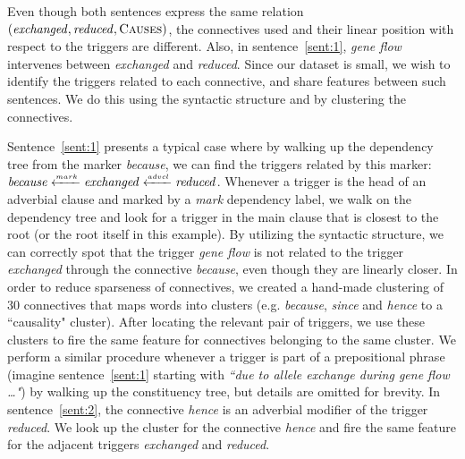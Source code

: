 Even though both sentences express the same relation $(\mbox{\emph{exchanged}},\mbox{\emph{reduced}},\mbox{\textsc{Causes}})$, the connectives used and their linear position with respect to the triggers are different. Also, in sentence~\ref{sent:1}, \emph{gene flow} intervenes between \emph{exchanged} and \emph{reduced}. Since our dataset is small, we wish to identify the triggers related to each connective, and share features between such sentences. We do this using the syntactic structure and by clustering the connectives.

Sentence~\ref{sent:1} presents a typical case where by walking up the dependency tree from the marker \emph{because}, we can find the triggers related by this marker: $\mbox{\emph{because}}\xleftarrow{\scriptscriptstyle mark}\mbox{\emph{exchanged}}\xleftarrow{\scriptscriptstyle advcl}\mbox{\emph{reduced}}$. Whenever a trigger is the head of an adverbial clause and marked by a \emph{mark} dependency label, we walk on the dependency tree and look for a trigger in the main clause that is closest to the root (or the root itself in this example). 
By utilizing the syntactic structure, we can correctly spot that the trigger \emph{gene flow} is not related to the trigger \emph{exchanged} through the connective \emph{because}, even though they are linearly closer. In order to reduce sparseness of connectives, we created a hand-made clustering of 30 connectives that maps words into clusters (e.g. \emph{because}, \emph{since} and \emph{hence} to a ``causality" cluster). After locating the relevant pair of triggers, we use these clusters to fire the same feature for connectives belonging to the same cluster. We perform a similar procedure whenever a trigger is part of a prepositional phrase (imagine sentence~\ref{sent:1} starting with \emph{``due to allele exchange during gene flow \ldots"}) by walking up the constituency tree, but details are omitted for brevity. In sentence~\ref{sent:2}, the connective \emph{hence} is an adverbial modifier of the trigger \emph{reduced}. We look up the cluster for the connective \emph{hence} and fire the same feature for the adjacent triggers \emph{exchanged} and \emph{reduced}.

